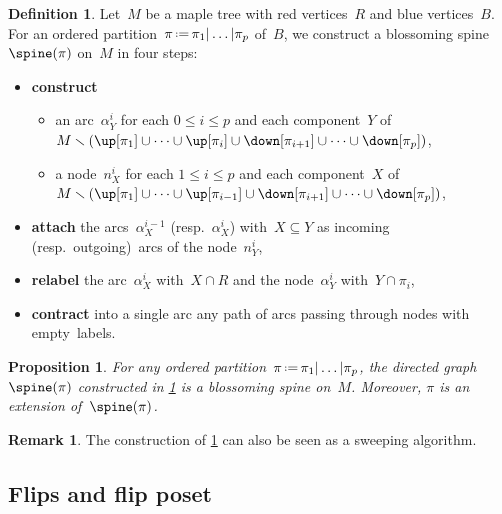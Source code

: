 \documentclass{amsart}
\newtheorem{proposition}[theorem]{Proposition}
\theoremstyle{definition}
\newtheorem{definition}[theorem]{Definition}
\newtheorem{remark}[theorem]{Remark}
\newcommand{\ssm}{\smallsetminus} %
\newcommand{\eqdef}{\mbox{\,\raisebox{0.2ex}{\scriptsize\ensuremath{\mathrm:}}\ensuremath{=}\,}} %
\newcommand{\vincent}[1]{\todo[color=blue!30]{#1 \\ \hfill --- V.}}
\begin{document}
\begin{definition}
  \label{def:surjection}
  Let~$M$ be a maple tree with red vertices~$R$ and blue vertices~$B$.
  For an ordered partition~$\pi \eqdef \pi_1 | \dots | \pi_p$ of~$B$, we construct a blossoming spine~$\spine(\pi)$ on~$M$ in four steps:
  \begin{itemize}[wide, labelwidth=!, labelindent=5pt]
    \item \textbf{construct}
    \begin{itemize}[wide, labelwidth=!, labelindent=10pt]
      \item an arc~$\alpha^i_Y$ for each $0 \le i \le p$ and each component~$Y$ of~$M \ssm (\up[\pi_1] \cup \dots \cup \up[\pi_i] \cup \down[\pi_{i+1}] \cup \dots \cup \down[\pi_p])$,
      \item a node~$n^i_X$ for each $1 \le i \le p$ and each component~$X$ of~$M \ssm (\up[\pi_1] \cup \dots \cup \up[\pi_{i-1}] \cup \down[\pi_{i+1}] \cup \dots \cup \down[\pi_p])$,
    \end{itemize}
    \item \textbf{attach} the arcs~$\alpha^{i-1}_X$ (resp.~$\alpha^i_X$) with~$X \subseteq Y$ as incoming (resp.~outgoing)~arcs of the node~$n^i_Y$,
    \item \textbf{relabel} the arc~$\alpha^i_X$ with~$X \cap R$ and the node~$\alpha^i_Y$ with~$Y \cap \pi_i$,
    \item \textbf{contract} into a single arc any path of arcs passing through nodes with empty~labels.
  \end{itemize}
\end{definition}

\begin{proposition}
  \label{prop:surjection}
  For any ordered partition~$\pi \eqdef \pi_1 | \dots | \pi_p$, the directed graph~$\spine(\pi)$ constructed in \cref{def:surjection} is a blossoming spine on~$M$.
  Moreover, $\pi$ is an extension of~$\spine(\pi)$.
  \vincent{explain}
\end{proposition}

\begin{remark}
  The construction of \cref{def:surjection} can also be seen as a sweeping algorithm.
  \vincent{todo}
\end{remark}



\subsection{Flips and flip poset}
\end{document}
